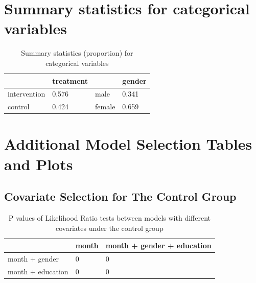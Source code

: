 

\section{Summary statistics for categorical variables}

\begin{table}[H]
\centering
\begin{tabular}{|l|l|l|l|}
\hline
& treatment & & gender\\
\hline
intervention & 0.576 & male & 0.341 \\
\hline
control & 0.424 & female & 0.659\\
\hline
\end{tabular}
\caption{Summary statistics (proportion) for categorical variables}
\label{tab:summ.stat.cat}
\end{table}

\section{Additional Model Selection Tables and Plots}
\subsection{Covariate Selection for The Control Group}
\begin{table}[H]
\centering
\begin{tabular}{|l|l|l|}
\hline
& month & month + gender + education \\
\hline
month + gender & 0 & 0 \\
\hline
month + education & 0 & 0 \\
\hline
\end{tabular}
\caption{P values of Likelihood Ratio tests between models with different covariates under the control group}
\label{tab:model.comp.control.lrt}
\end{table}
